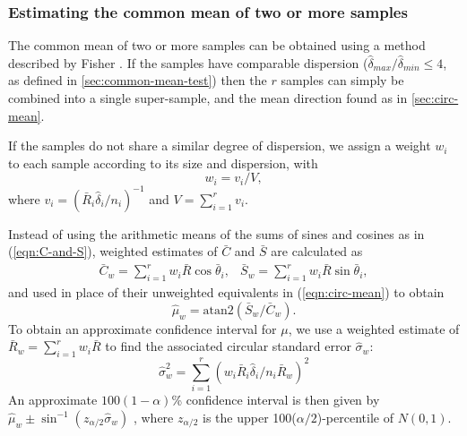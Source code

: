\documentclass[../../ArchStats.tex]{subfiles}
\begin{document}

\subsubsection{Estimating the common mean of two or more samples}
\label{sec:est-pooled-mean}

The common mean of two or more samples can be obtained using a method described by Fisher \cite[section5.3.5]{Fisher1993}. If the samples have comparable dispersion ($\hat{\delta}_{max} / \hat{\delta}_{min} \leq 4$, as defined in \ref{sec:common-mean-test}) then the $r$ samples can simply be combined into a single super-sample, and the mean direction found as in \ref{sec:circ-mean}.

If the samples do not share a similar degree of dispersion, we assign a weight $w_i$ to each sample according to its size and dispersion, with
\[w_i = v_i/V,\]
where $v_i = (\bar{R}_i \hat{\delta}_i / n_i)^{-1}$ and $V = \sum_{i=1}^r v_i$.

Instead of using the arithmetic means of the sums of sines and cosines as in (\ref{eqn:C-and-S}), weighted estimates of $\bar{C}$ and $\bar{S}$ are calculated as
	\[ \begin{matrix*}
	\bar{C}_w = \sum_{i=1}^r w_i \bar{R} \cos \bar{\theta}_i, & 
	\bar{S}_w = \sum_{i=1}^r w_i \bar{R} \sin \bar{\theta}_i,
	\end{matrix*} \]
and used in place of their unweighted equivalents in (\ref{eqn:circ-mean}) to obtain
\[\hat{\mu}_w = \text{atan2}(\bar{S}_w/\bar{C}_w).\]
To obtain an approximate confidence interval for $\mu$, we use a weighted estimate of $\bar{R}_w = \sum_{i=1}^r w_i \bar{R}$ to find the associated circular standard error $\hat{\sigma}_w$:
\[ \hat{\sigma}_w^2 = \sum_{i=1}^r \left( w_i \bar{R}_i \hat{\delta}_i / n_i \bar{R}_w \right) ^2\]
An approximate $100(1-\alpha)$\% confidence interval is then given by
 $ \hat{\mu}_w \pm \sin^{-1}(z_{\alpha/2} \hat{\sigma}_w)$ ,
where $z_{\alpha/2}$ is the upper 100($\alpha/2$)-percentile of $N(0,1)$.

\end{document}
